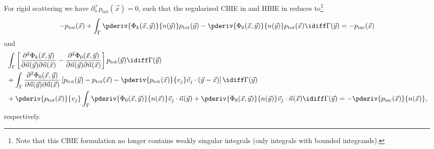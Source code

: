 For rigid scattering we have $\partial_n^+ p_{\mathrm{tot}}(\vec{x}) = 0$, such that the regularized CBIE in  and HBIE in  reduces to\footnote{Note that this CBIE formulation no longer contains weakly singular integrals (only integrals with bounded integrands).}
\begin{equation}\label{Eq3:regulCBIErigid}
	-p_{\mathrm{tot}}(\vec{x}) + \int_\Gamma \pderiv{\Phi_k(\vec{x},\vec{y})}{n(\vec{y})}p_{\mathrm{tot}}(\vec{y}) - \pderiv{\Phi_0(\vec{x},\vec{y})}{n(\vec{y})} p_{\mathrm{tot}}(\vec{x}) \idiff\Gamma(\vec{y}) = -p_{\mathrm{inc}}(\vec{x})
\end{equation}
and 
\begin{align*}
	&\int_\Gamma\left[\frac{\partial^2\Phi_k(\vec{x},\vec{y})}{\partial\vec{n}(\vec{y})\partial\vec{n}(\vec{x})} - \frac{\partial^2\Phi_0(\vec{x},\vec{y})}{\partial\vec{n}(\vec{y})\partial\vec{n}(\vec{x})}\right] p_{\mathrm{tot}}(\vec{y}) \idiff\Gamma(\vec{y}) \\
	&+\int_\Gamma \frac{\partial^2\Phi_0(\vec{x},\vec{y})}{\partial\vec{n}(\vec{y})\partial\vec{n}(\vec{x})}\left[ p_{\mathrm{tot}}(\vec{y}) - p_{\mathrm{tot}}(\vec{x}) - \pderiv{p_{\mathrm{tot}}(\vec{x})}{v_j} \vec{v}_j\cdot(\vec{y}-\vec{x})\right] \idiff\Gamma(\vec{y})\\
	&+\pderiv{p_{\mathrm{tot}}(\vec{x})}{v_j}\int_\Gamma \pderiv{\Phi_0(\vec{x},\vec{y})}{n(\vec{x})}\vec{v}_j\cdot \vec{n}(\vec{y})
	+ \pderiv{\Phi_0(\vec{x},\vec{y})}{n(\vec{y})}\vec{v}_j\cdot \vec{n}(\vec{x}) \idiff\Gamma(\vec{y}) = -\pderiv{p_{\mathrm{inc}}(\vec{x})}{n(\vec{x})},
\end{align*}
respectively.
%
%
